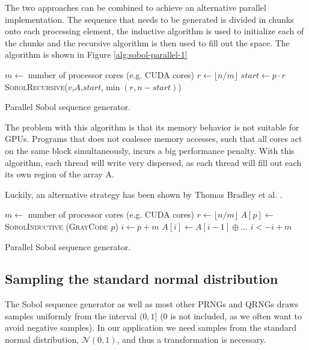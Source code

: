 The two approaches can be combined to achieve an alternative parallel
implementation. The sequence that needs to be generated is divided in
chunks onto each processing element, the inductive algorithm is used
to initialize each of the chunks and the recursive algorithm is then
used to fill out the space. The algorithm is shown in Figure
\ref{alg:sobol-parallel-1}

\begin{algorithm}
  \begin{algorithmic}
    \State $m \gets$ number of processor cores (e.g. CUDA cores)
    \State $r \gets \lfloor n/m \rfloor$
    \State $start \gets p\cdot r$
    \State \textsc{SobolRecursive}($v$,$A$,$start$,$\min(r,n-start)$)
    \EndParFor
    \EndFunction
  \end{algorithmic}
  \caption{Parallel Sobol sequence generator.}
  \label{alg:sobol-parallel-1}
\end{algorithm}

The problem with this algorithm is that its memory behavior is not
suitable for GPUs. Programs that does not coalesce memory accesses,
such that all cores act on the same block simultaneously, incurs a big
performance penalty. With this algorithm, each thread will write very
dispersed, as each thread will fill out each its own region of the
array A.

Luckily, an alternative strategy has been shown by Thomas Bradley et
al. \cite[Chapter~16]{hwy2011emerald}.

\begin{algorithm}
  \begin{algorithmic}
    \State $m \gets$ number of processor cores (e.g. CUDA cores)
    \State $r \gets \lfloor n/m \rfloor$
    \State $A[p] \gets$ \textsc{SobolInductive} (\textsc{GrayCode} $p$)
    \State $i \gets p + m$
    \State $A[i] \gets A[i - 1] \oplus \ldots$
    \State $i <- i + m$
    \EndWhile
    \EndParFor
    \EndFunction
  \end{algorithmic}
  \caption{Parallel Sobol sequence generator.}
  \label{alg:sobol-parallel-1}
\end{algorithm}


\subsection{Sampling the standard normal distribution}
\label{sec:sampling_normaldist}
The Sobol sequence generator as well as most other PRNGs and QRNGs
draws samples uniformly from the interval $(0,1]$ ($0$ is not
included, as we often want to avoid negative samples). In our
application we need samples from the standard normal distribution,
$\mathcal{N}(0,1)$, and thus a transformation is necessary.


